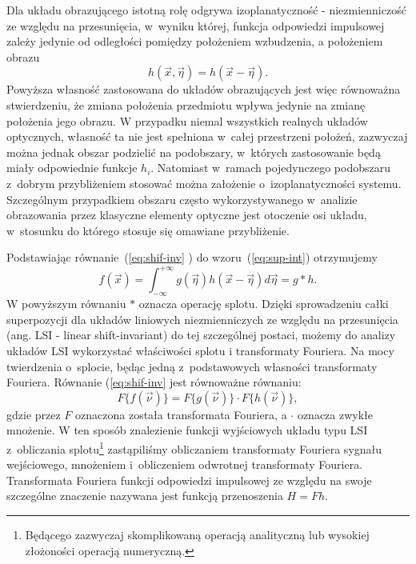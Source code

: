Dla układu obrazującego istotną rolę odgrywa izoplanatyczność - niezmienniczość ze względu na przesunięcia, w~wyniku której, funkcja odpowiedzi impulsowej zależy jedynie od odległości pomiędzy położeniem wzbudzenia, a położeniem obrazu
\begin{equation}
h(\vec{x},\vec{\eta})=h(\vec{x}-\vec{\eta}).
\label{eq:shif-inv}
\end{equation}
Powyższa własność zastosowana do układów obrazujących jest więc równoważna stwierdzeniu, że zmiana położenia przedmiotu wpływa jedynie na zmianę położenia jego obrazu. W przypadku niemal wszystkich realnych układów optycznych, własność ta nie jest spełniona w~całej przestrzeni położeń, zazwyczaj można jednak obszar podzielić na podobszary, w~których zastosowanie będą miały odpowiednie funkcje $h_i$. Natomiast w~ramach pojedynczego podobszaru z~dobrym przybliżeniem stosować można założenie o~izoplanatyczności systemu. Szczególnym przypadkiem obszaru często wykorzystywanego w~analizie obrazowania przez klasyczne elementy optyczne jest otoczenie osi układu, w~stosunku do którego stosuje się omawiane przybliżenie.

Podstawiając równanie~(\ref{eq:shif-inv} ) do wzoru~(\ref{eq:sup-int}) otrzymujemy
\begin{equation}
f(\vec{x})=\int_{-\infty}^{+\infty} g(\vec{\eta})  h(\vec{x}-\vec{\eta}) d \vec{\eta} = g \ast h.
\label{eq:splot}
\end{equation}
W powyższym równaniu $\ast$ oznacza operację splotu. Dzięki sprowadzeniu całki superpozycji dla układów liniowych niezmienniczych ze względu na przesunięcia (ang. LSI - linear shift-invariant) do tej szczególnej postaci, możemy do analizy układów LSI wykorzystać właściwości splotu i transformaty Fouriera. Na mocy twierdzenia o~splocie, będąc jedną z~podstawowych własności transformaty Fouriera. Równanie (\ref{eq:shif-inv} jest równoważne równaniu: 
\begin{equation}
F\{f(\vec{\nu})\} = F\{g(\vec{\nu})\} \cdot F\{h(\vec{\nu})\},
\label{eq:transfer-mult}
\end{equation}
gdzie przez $F$ oznaczona została transformata Fouriera, a $\cdot$ oznacza zwykłe mnożenie. W ten sposób znalezienie funkcji wyjściowych układu typu LSI z~obliczania splotu\footnote{Będącego zazwyczaj skomplikowaną operacją analityczną lub wysokiej złożoności operacją numeryczną.} zastąpiliśmy obliczaniem transformaty Fouriera sygnału wejściowego, mnożeniem i~obliczeniem odwrotnej transformaty Fouriera. Transformata Fouriera funkcji odpowiedzi impulsowej ze względu na swoje szczególne znaczenie nazywana jest funkcją przenoszenia $H=F{h}$.


